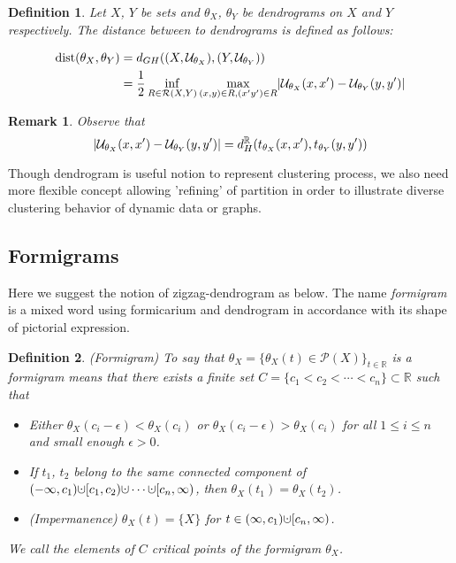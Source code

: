 \documentclass[a4paper,12pt]{article}
\newtheorem{remark}{Remark}[section]
\newtheorem{definition}{Definition}[section]
\newcommand{\dotcup}{\ensuremath{\mathaccent\cdot\cup}}
\DeclarePairedDelimiter{\abs}{\lvert}{\rvert}
\begin{document}
\begin{definition} Let $X$, $Y$ be sets and $\theta_X$, $\theta_Y$ be dendrograms on $X$ and $Y$ respectively. The distance between to dendrograms is defined as follows:\label{dist}

\begin{align*}
\mathrm{dist}(\theta_X, \theta_Y)&=d_{GH}((X,\mathcal{U}_{\theta_X}),(Y,\mathcal{U}_{\theta_Y}))\\&= \frac{1}{2}\inf_{R\in\mathcal{R}(X,Y)}\max_{(x,y)\in R, (x'y')\in R}\abs{\mathcal{U}_{\theta_X}(x,x')-\mathcal{U}_{\theta_Y}(y,y')}
\end{align*}
\end{definition} 
\begin{remark}Observe that $$\abs{\mathcal{U}_{\theta_X}(x,x')-\mathcal{U}_{\theta_Y}(y,y')}=d_{H}^{\mathbb{R}}(t_{\theta_X}(x,x'), t_{\theta_Y}(y,y'))$$
\end{remark}
Though dendrogram is useful notion to represent clustering process, we also need more flexible concept allowing 'refining' of partition in order to illustrate diverse clustering behavior of dynamic data or graphs.



\subsection{Formigrams}
Here we suggest the notion of zigzag-dendrogram as below. The name \emph{formigram} is a mixed word using formicarium and dendrogram in accordance with its shape of pictorial expression.
\begin{definition} (Formigram)
To say that $\theta_X=\{\theta_X(t)\in \mathcal{P}(X)\}_{t\in\mathbb{R}}
$ is a formigram means that there exists a finite set $C=\{c_1< c_2< \cdots< c_n\} \subset \mathbb{R}$ such that

\begin{itemize}
\item[1.] Either $\theta_X(c_i-\epsilon) <\theta_X(c_i)$ or $\theta_X(c_i-\epsilon) > \theta_X(c_i)$  for all $1 \leq i \leq n$ and small enough $\epsilon>0$. 

\item[2.] If $t_1$, $t_2$ belong to the same connected component of $(-\infty, c_1)\dotcup [c_1, c_2) \dotcup \cdots \dotcup [c_n,\infty)$, then $\theta_X(t_1)=\theta_X(t_2)$.
\item[3.](Impermanence) $\theta_X(t)=\{X\}$ for $t\in (\infty, c_1)\dotcup [c_n,\infty)$. \label{def}
\end{itemize}
We call the elements of $C$ critical points of the formigram $\theta_X$.
\end{definition}
\end{document}
